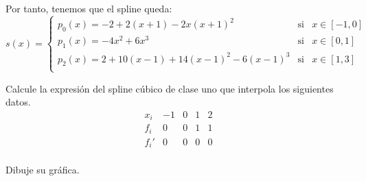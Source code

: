 \begin{ejercicio}
    Por tanto, tenemos que el spline queda:
    \begin{equation*}
        s(x)=\left\{\begin{array}{lll}
            p_0(x)=-2+2(x+1)-2x(x+1)^2 & \text{si} & x\in [-1, 0] \\
            p_1(x)=-4x^2+6x^3 & \text{si} & x\in [0,1] \\
            p_2(x)=2+10(x-1)+14(x-1)^2-6(x-1)^3 & \text{si} & x\in [1,3] \\
        \end{array} \right.
    \end{equation*}

    
\end{ejercicio}

\begin{ejercicio}
    Calcule la expresión del spline cúbico de clase uno que interpola los siguientes datos.
    \begin{equation*}
        \begin{array}{c|cccc}
            x_i & -1 & 0 & 1 & 2 \\ \hline
            f_i & 0 & 0 & 1 & 1 \\ \hline
            f_i' & 0 & 0 & 0 & 0\\
        \end{array}
    \end{equation*}

    Dibuje su gráfica.


\end{ejercicio}
